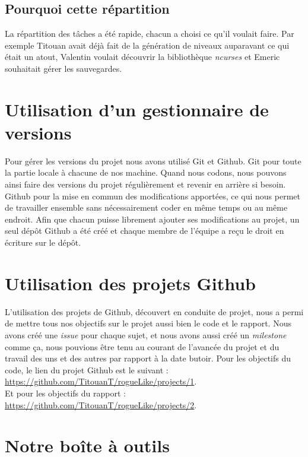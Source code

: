\documentclass[11pt]{report}
\begin{document}
		\subsection{Pourquoi cette répartition}
		
		La répartition des tâches a été rapide, chacun a choisi ce qu'il voulait faire. Par exemple Titouan avait déjà fait de la génération de niveaux auparavant ce qui était un atout, Valentin voulait découvrir la bibliothèque \emph{ncurses} et Emeric souhaitait gérer les sauvegardes.

	\section{Utilisation d'un gestionnaire de versions}
	
		Pour gérer les versions du projet nous avons utilisé Git et Github. Git pour toute la partie locale à chacune de nos machine. Quand nous codons, nous pouvons ainsi faire des versions du projet régulièrement et revenir en arrière si besoin. Github pour la mise en commun des modifications apportées, ce qui nous permet de travailler ensemble sans nécessairement coder en même temps ou au même endroit. Afin que chacun puisse librement ajouter ses modifications au projet, un seul dépôt Github a été créé et chaque membre de l'équipe a reçu le droit en écriture sur le dépôt.
	
	\section{Utilisation des projets Github}
	
		L'utilisation des projets de Github, découvert en conduite de projet, nous a permi de mettre tous nos objectifs sur le projet aussi bien le code et le rapport. Nous avons créé une \emph{issue} pour chaque sujet, et nous avons aussi créé un \emph{milestone} comme ça, nous pouvions être tenu au courant de l'avancée du projet et du travail des uns et des autres par rapport à la date butoir.
		Pour les objectifs du code, le lien du projet Github est le suivant : \href{https://github.com/TitouanT/rogueLike/projects/1}{ https://github.com/TitouanT/rogueLike/projects/1}. \\
		Et pour les objectifs du rapport :  \href{https://github.com/TitouanT/rogueLike/projects/2} {https://github.com/TitouanT/rogueLike/projects/2}.

	\section{Notre boîte à outils} 
\end{document}

